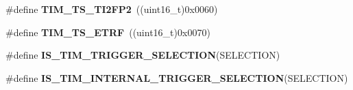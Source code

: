 \begin{DoxyCompactItemize}
\item 
\hypertarget{group__TIM__Internal__Trigger__Selection_ga0ed58a269bccd3f22d19cc9a2ba3123f}{
\#define {\bfseries TIM\_\-TS\_\-TI2FP2}~((uint16\_\-t)0x0060)}
\label{group__TIM__Internal__Trigger__Selection_ga0ed58a269bccd3f22d19cc9a2ba3123f}

\item 
\hypertarget{group__TIM__Internal__Trigger__Selection_gaece08e02e056613a882aa7ff0a6ccc2d}{
\#define {\bfseries TIM\_\-TS\_\-ETRF}~((uint16\_\-t)0x0070)}
\label{group__TIM__Internal__Trigger__Selection_gaece08e02e056613a882aa7ff0a6ccc2d}

\item 
\#define {\bfseries IS\_\-TIM\_\-TRIGGER\_\-SELECTION}(SELECTION)
\item 
\#define {\bfseries IS\_\-TIM\_\-INTERNAL\_\-TRIGGER\_\-SELECTION}(SELECTION)
\end{DoxyCompactItemize}


